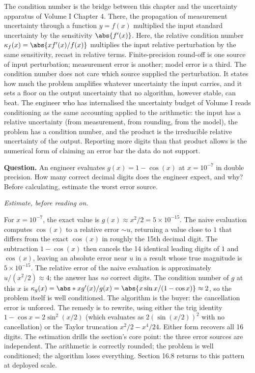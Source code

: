 \begin{archetype}[Uncertainty]
The condition number is the bridge between this chapter and the
uncertainty apparatus of Volume I Chapter 4. There, the propagation
of measurement uncertainty through a function $y = f(x)$ multiplied
the input standard uncertainty by the sensitivity $\abs{f'(x)}$.
Here, the relative condition number $\kappa_{f}(x) = \abs{x f'(x) /
f(x)}$ multiplies the input relative perturbation by the same
sensitivity, recast in relative terms. Finite-precision round-off is
one source of input perturbation; measurement error is another;
model error is a third. The condition number does not care which
source supplied the perturbation. It states how much the problem
amplifies whatever uncertainty the input carries, and it sets a
floor on the output uncertainty that no algorithm, however stable,
can beat. The engineer who has internalised the uncertainty budget
of Volume I reads conditioning as the same accounting applied to the
arithmetic: the input has a relative uncertainty (from measurement,
from rounding, from the model), the problem has a condition number,
and the product is the irreducible relative uncertainty of the
output. Reporting more digits than that product allows is the
numerical form of claiming an error bar the data do not support.
\end{archetype}

\begin{estimation}
\textbf{Question.} An engineer evaluates
$g(x) = 1 - \cos(x)$ at $x = 10^{-7}$ in double precision. How many
correct decimal digits does the engineer expect, and why? Before
calculating, estimate the worst error source.

\smallskip
\textit{Estimate, before reading on.}

\smallskip
For $x = 10^{-7}$, the exact value is $g(x) \approx x^{2}/2 =
5 \times 10^{-15}$. The naive evaluation computes $\cos(x)$ to a
relative error $\sim u$, returning a value close to $1$ that
differs from the exact $\cos(x)$ in roughly the 15th decimal
digit. The subtraction $1 - \cos(x)$ then cancels the 14 identical
leading digits of $1$ and $\cos(x)$, leaving an absolute error
near $u$ in a result whose true magnitude is $5 \times 10^{-15}$.
The relative error of the naive evaluation is approximately
$u / (x^{2}/2) \approx 4$; the answer has \emph{no} correct
digits. The condition number of $g$ at this $x$ is
$\kappa_{g}(x) = \abs*{x g'(x)/g(x)} = \abs{x \sin x / (1 - \cos
x)} \approx 2$, so the problem itself is well conditioned. The
algorithm is the buyer: the cancellation error is unforced. The
remedy is to rewrite, using either the trig identity $1 - \cos x
= 2 \sin^{2}(x/2)$ (which evaluates as $2 (\sin(x/2))^{2}$ with no
cancellation) or the Taylor truncation $x^{2}/2 - x^{4}/24$. Either
form recovers all 16 digits. The estimation drills the section's
core point: the three error sources are independent. The arithmetic
is correctly rounded; the problem is well conditioned; the algorithm
loses everything. Section 16.8 returns to this pattern at deployed
scale.
\end{estimation}

